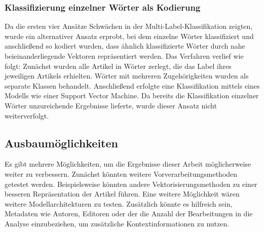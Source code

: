 \subsubsection{Klassifizierung einzelner Wörter als Kodierung}
Da die ersten vier Ansätze Schwächen in der Multi-Label-Klassifikation zeigten, wurde ein alternativer Ansatz erprobt, bei dem einzelne Wörter klassifiziert und anschließend so kodiert wurden, dass ähnlich klassifizierte Wörter durch nahe beieinanderliegende Vektoren repräsentiert werden. Das Verfahren verlief wie folgt: Zunächst wurden alle Artikel in Wörter zerlegt, die das Label ihres jeweiligen Artikels erhielten. Wörter mit mehreren Zugehörigkeiten wurden als separate Klassen behandelt. Anschließend erfolgte eine Klassifikation mittels eines Modells wie einer Support Vector Machine. Da bereits die Klassifikation einzelner Wörter unzureichende Ergebnisse lieferte, wurde dieser Ansatz nicht weiterverfolgt.


\subsection{Ausbaumöglichkeiten}
Es gibt mehrere Möglichkeiten, um die Ergebnisse dieser Arbeit möglicherweise weiter zu verbessern. Zunächst könnten weitere Vorverarbeitungsmethoden getestet werden. Beispielsweise könnten andere Vektorisierungsmethoden zu einer besseren Repräsentation der Artikel führen. Eine weitere Möglichkeit wären weitere Modellarchitekturen zu testen. Zusätzlich könnte es hilfreich sein, Metadaten wie Autoren, Editoren oder der die Anzahl der Bearbeitungen in die Analyse einzubeziehen, um zusätzliche Kontextinformationen zu nutzen.

